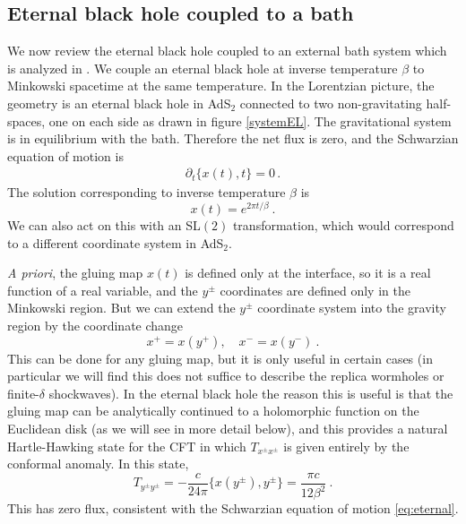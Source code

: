 \documentclass[11pt,oneside,letterpaper]{article}
\newcommand{\p}{\partial}
\newcommand{\be}{\begin{equation}}
\newcommand{\ee}{\end{equation}}
\def\be{\begin{eqnarray}}
\def\ee{\end{eqnarray}}
\def\be{\begin{equation}}
\def\ee{\end{equation}}
\def\ba{\begin{eqnarray}}
\def\ea{\end{eqnarray}}
\renewcommand{\p}{\partial}
\numberwithin{equation}{section}
\def\p{{\phi}}
\def\be{\begin{equation}}
\def\ee{\end{equation}}
\def\ba{\begin{eqnarray}}
\def\ea{\end{eqnarray}}
\def \be {\begin{equation}}
\def \ee {\end{equation}}
\renewcommand{\p}{\partial}
\begin{document}
\begin{spacing}{1.1}
\subsection{Eternal black hole coupled to a bath}
We now review the eternal black hole coupled to an external bath system which is analyzed in \cite{Almheiri:2019psf}. We couple an eternal black hole at inverse temperature $\beta$ to Minkowski spacetime at the same temperature. In the Lorentzian picture, the geometry  is an eternal black hole in AdS$_2$ connected to two non-gravitating half-spaces, one on each side as drawn in figure \ref{systemEL}. The gravitational system is in equilibrium with the bath. Therefore the net flux is zero, and the Schwarzian equation of motion is
\ba\label{eq:eternal}
\p_t \{x(t),t\} =0\, .
\ea
The solution corresponding to inverse temperature $\beta$ is
\be\label{solueternal}
x(t) = e^{2\pi t / \beta} \ .
\ee
We can also act on this with an SL$(2)$ transformation, which would correspond to a different coordinate system in AdS$_2$.

\textit{A priori}, the gluing map $x(t)$ is defined only at the interface, so it is a real function of a real variable, and the $y^\pm$ coordinates are defined only in the Minkowski region. But we can extend the $y^{\pm}$ coordinate system  into the gravity region by the coordinate change
\be\label{xyrel}
x^+ = x(y^+) , \quad x^- = x(y^-) \ .
\ee
This can be done for any gluing map, but it is only useful in certain cases (in particular we will find this does not suffice to describe the replica wormholes or finite-$\delta$ shockwaves). In the eternal black hole the reason this is useful is that the gluing map can be analytically continued to a holomorphic function on the Euclidean disk (as we will see in more detail below), and this provides a natural Hartle-Hawking state for the CFT in which $T_{x^\pm x^\pm}$ is given entirely by the conformal anomaly. In this state, 
\be\label{stress_eternal}
T_{y^\pm y^\pm} = - \frac{c}{24\pi}\{ x(y^\pm), y^\pm \} = \frac{\pi c}{12\beta^2} \ .
\ee
This has zero flux, consistent with the Schwarzian equation of motion  \eqref{eq:eternal}.


\end{spacing}
\end{document}
